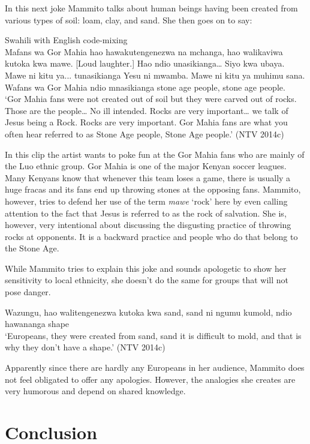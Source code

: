 \documentclass[output=paper]{langsci/langscibook}
\begin{document}
In this next joke Mammito talks about human beings having been created from various types of soil: loam, clay, and sand. She then goes on to say:

\ea
{Swahili with English code-mixing}\\
Mafans wa Gor Mahia hao hawakutengenezwa na mchanga, hao walikaviwa kutoka kwa mawe. \textup{[Loud laughter.]} Hao ndio unasikianga… Siyo kwa ubaya. Mawe ni kitu ya... tunasikianga Yesu ni mwamba. Mawe ni kitu ya muhimu sana. Wafans wa Gor Mahia ndio mnasikianga stone age people, stone age people.\\
\glt ‘Gor Mahia fans were not created out of soil but they were carved out of rocks. Those are the people… No ill intended. Rocks are very important… we talk of Jesus being a Rock. Rocks are very important. Gor Mahia fans are what you often hear referred to as Stone Age people, Stone Age people.’ (NTV 2014c)
\z

In this clip the artist wants to poke fun at the Gor Mahia fans who are mainly of the Luo ethnic group. Gor Mahia is one of the major Kenyan soccer leagues. Many Kenyans know that whenever this team loses a game, there is usually a huge fracas and its fans end up throwing stones at the opposing fans. Mammito, however, tries to defend her use of the term \textit{mawe }‘rock’ here by even calling attention to the fact that Jesus is referred to as the rock of salvation. She is, however, very intentional about discussing the disgusting practice of throwing rocks at opponents. It is a backward practice and people who do that belong to the Stone Age.

   While Mammito tries to explain this joke and sounds apologetic to show her sensitivity to local ethnicity, she doesn’t do the same for groups that will not pose danger. 
 
\ea
 Wazungu, hao walitengenezwa kutoka kwa sand, sand ni ngumu kumold, ndio hawananga shape \\
\glt ‘Europeans, they were created from sand, sand it is difficult to mold, and that is why they don’t have a shape.’ (NTV 2014c)
\z

Apparently since there are hardly any Europeans in her audience, Mammito does not feel obligated to offer any apologies. However, the analogies she creates are very humorous and depend on shared knowledge. 

\section{Conclusion}
\end{document}
